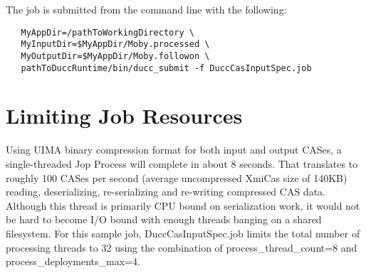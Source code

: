 The job is submitted from the command line with the following:
\begin{verbatim}
   MyAppDir=/pathToWorkingDirectory \
   MyInputDir=$MyAppDir/Moby.processed \ 
   MyOutputDir=$MyAppDir/Moby.followon \
   pathToDuccRuntime/bin/ducc_submit -f DuccCasInputSpec.job
\end{verbatim}

\section{Limiting Job Resources}
Using UIMA binary compression format for both input and output CASes, a single-threaded Jop Process will complete in about 8 seconds. That translates to roughly 100 CASes per second (average uncompressed XmiCas size of 140KB) reading, deserializing, re-serializing and re-writing compressed CAS data.
Although this thread is primarily CPU bound on serialization work, it would not be hard to become I/O bound with enough threads banging on a shared filesystem. For this sample job, DuccCasInputSpec.job limits the total number of processing threads to 32 using the combination of process\_thread\_count=8 and process\_deployments\_max=4.


